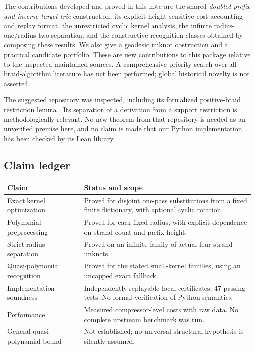 \documentclass[11pt,a4paper]{article}
\theoremstyle{definition}\newtheorem{definition}[theorem]{Definition}
\theoremstyle{remark}\newtheorem{remark}[theorem]{Remark}
\newcommand{\code}[1]{\texttt{\detokenize{#1}}}
\begin{document}
The contributions developed and proved in this note are the shared
\emph{doubled-prefix and inverse-target-trie} construction, its explicit
height-sensitive cost accounting and replay format, the unrestricted cyclic
kernel analysis, the infinite radius-one/radius-two separation, and the
constructive recognition classes obtained by composing these results.
We also give a geodesic unknot obstruction and a practical candidate portfolio.
These are new contributions to this package relative to the inspected
maintained sources. A comprehensive priority search over all braid-algorithm
literature has not been performed; global historical novelty is not asserted.

The suggested \code{openai/math} repository was inspected, including its
formalized positive-braid restriction lemma
\cite{OpenAIRestriction}. Its separation of a derivation from a support
restriction is methodologically relevant. No new theorem from that repository
is needed as an unverified premise here, and no claim is made that our Python
implementation has been checked by its Lean library.

\subsection{Claim ledger}
\begin{center}\small
\begin{tabular}{p{}p{}}
\toprule
Claim & Status and scope\\
\midrule
Exact kernel optimization & Proved for disjoint one-pass substitutions from a fixed finite dictionary, with optional cyclic rotation.\\
Polynomial preprocessing & Proved for each fixed radius, with explicit dependence on strand count and prefix height.\\
Strict radius separation & Proved on an infinite family of actual four-strand unknots.\\
Quasi-polynomial recognition & Proved for the stated small-kernel families, using an uncapped exact fallback.\\
Implementation soundness & Independently replayable local certificates; 47 passing tests. No formal verification of Python semantics.\\
Performance & Measured compressor-level costs with raw data. No complete upstream benchmark was run.\\
General quasi-polynomial bound & Not established; no universal structural hypothesis is silently assumed.\\
\bottomrule
\end{tabular}
\end{center}
\end{document}
